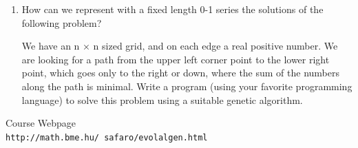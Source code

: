 \documentclass[12pt,english]{article}
\begin{document}
\begin{enumerate}
\item How can we represent with a fixed length 0-1 series the solutions of the following problem?

We have an n × n sized grid, and on each edge a real positive number.
We are looking for a path from the upper left corner point to the lower
right point, which goes only to the right or down, where the sum of the numbers along the path is minimal. Write a program (using your favorite programming language) to solve this problem using a suitable genetic algorithm.


\end{enumerate}


\begin{thebibliography}{9}

Course Webpage
\\\texttt{http://math.bme.hu/~safaro/evolalgen.html}

\end{thebibliography}
\end{document}
